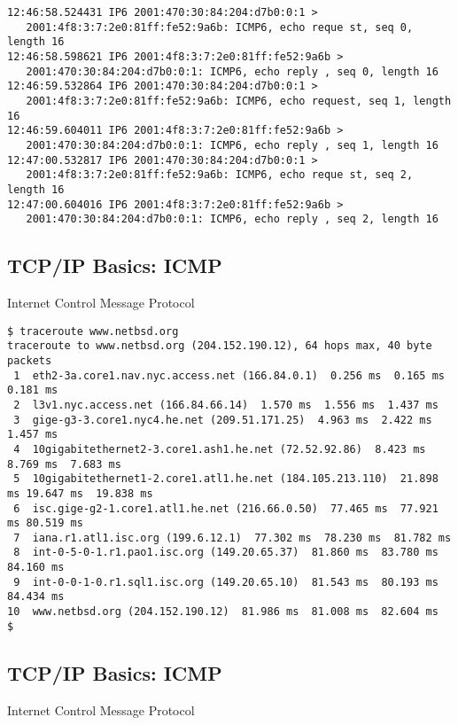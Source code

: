 \documentclass[xga]{xdvislides}
\begin{document}
\begin{verbatim}
12:46:58.524431 IP6 2001:470:30:84:204:d7b0:0:1 >
   2001:4f8:3:7:2e0:81ff:fe52:9a6b: ICMP6, echo reque st, seq 0, length 16
12:46:58.598621 IP6 2001:4f8:3:7:2e0:81ff:fe52:9a6b >
   2001:470:30:84:204:d7b0:0:1: ICMP6, echo reply , seq 0, length 16
12:46:59.532864 IP6 2001:470:30:84:204:d7b0:0:1 >
   2001:4f8:3:7:2e0:81ff:fe52:9a6b: ICMP6, echo request, seq 1, length 16
12:46:59.604011 IP6 2001:4f8:3:7:2e0:81ff:fe52:9a6b >
   2001:470:30:84:204:d7b0:0:1: ICMP6, echo reply , seq 1, length 16
12:47:00.532817 IP6 2001:470:30:84:204:d7b0:0:1 >
   2001:4f8:3:7:2e0:81ff:fe52:9a6b: ICMP6, echo reque st, seq 2, length 16
12:47:00.604016 IP6 2001:4f8:3:7:2e0:81ff:fe52:9a6b >
   2001:470:30:84:204:d7b0:0:1: ICMP6, echo reply , seq 2, length 16
\end{verbatim}


\subsection{TCP/IP Basics: ICMP}
\begin{center}
Internet Control Message Protocol
\end{center}
\vspace{.2in}

\begin{verbatim}
$ traceroute www.netbsd.org
traceroute to www.netbsd.org (204.152.190.12), 64 hops max, 40 byte packets
 1  eth2-3a.core1.nav.nyc.access.net (166.84.0.1)  0.256 ms  0.165 ms 0.181 ms
 2  l3v1.nyc.access.net (166.84.66.14)  1.570 ms  1.556 ms  1.437 ms
 3  gige-g3-3.core1.nyc4.he.net (209.51.171.25)  4.963 ms  2.422 ms  1.457 ms
 4  10gigabitethernet2-3.core1.ash1.he.net (72.52.92.86)  8.423 ms  8.769 ms  7.683 ms
 5  10gigabitethernet1-2.core1.atl1.he.net (184.105.213.110)  21.898 ms 19.647 ms  19.838 ms
 6  isc.gige-g2-1.core1.atl1.he.net (216.66.0.50)  77.465 ms  77.921 ms 80.519 ms
 7  iana.r1.atl1.isc.org (199.6.12.1)  77.302 ms  78.230 ms  81.782 ms
 8  int-0-5-0-1.r1.pao1.isc.org (149.20.65.37)  81.860 ms  83.780 ms 84.160 ms
 9  int-0-0-1-0.r1.sql1.isc.org (149.20.65.10)  81.543 ms  80.193 ms 84.434 ms
10  www.netbsd.org (204.152.190.12)  81.986 ms  81.008 ms  82.604 ms
$
\end{verbatim}

\subsection{TCP/IP Basics: ICMP}
\begin{center}
Internet Control Message Protocol
\end{center}
\end{document}
